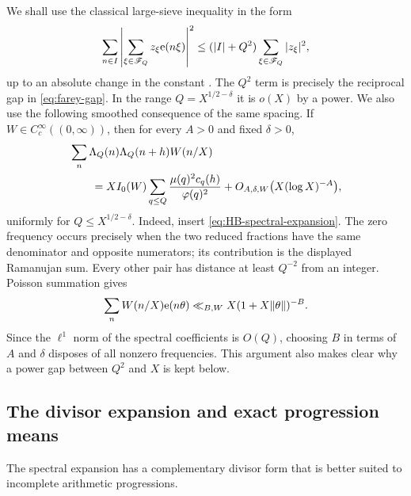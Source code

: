 We shall use the classical large-sieve inequality in the form
\begin{equation}
 \sum_{n\in I}
 \left|\sum_{\xi\in\mathscr F_Q}z_\xi\mathrm e(n\xi)\right|^2
 \leq (|I|+Q^2)
 \sum_{\xi\in\mathscr F_Q}|z_\xi|^2,
 \label{eq:farey-large-sieve}
\end{equation}
up to an absolute change in the constant \citep{MontgomeryVaughan1973}.
The $Q^2$ term is precisely the
reciprocal gap in \eqref{eq:farey-gap}.  In the range
$Q=X^{1/2-\delta}$ it is $o(X)$ by a power.  We also use the following
smoothed consequence of the same spacing.  If $W\in C_c^\infty((0,\infty))$,
then for every $A>0$ and fixed $\delta>0$,
\begin{align}
 &\sum_n\Lambda_Q(n)\Lambda_Q(n+h)W(n/X)
 \notag\\
 &\qquad={}
 XI_0(W)
 \sum_{q\leq Q}\frac{\mu(q)^2c_q(h)}{\varphi(q)^2}
 +O_{A,\delta,W}\bigl(X(\log X)^{-A}\bigr),
 \label{eq:model-autocorrelation-preliminary}
\end{align}
uniformly for $Q\leq X^{1/2-\delta}$.  Indeed, insert
\eqref{eq:HB-spectral-expansion}.  The zero frequency occurs precisely
when the two reduced fractions have the same denominator and opposite
numerators; its contribution is the displayed Ramanujan sum.  Every other
pair has distance at least $Q^{-2}$ from an integer.  Poisson summation
gives
\[
 \sum_nW(n/X)\mathrm e(n\theta)
 \ll_{B,W}X(1+X\|\theta\|)^{-B}.
\]
Since the $\ell^1$ norm of the spectral coefficients is $O(Q)$, choosing
$B$ in terms of $A$ and $\delta$ disposes of all nonzero frequencies.
This argument also makes clear why a power gap between $Q^2$ and $X$ is
kept below.

\subsection{The divisor expansion and exact progression means}

The spectral expansion has a complementary divisor form that is better
suited to incomplete arithmetic progressions.

